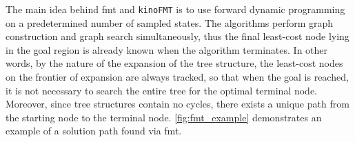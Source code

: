 \begin{algorithm}
\caption{$\texttt{kinoFMT}(x_{init}, X_{goal}, \mathbb{X}, n, J_{th})$}
\label{alg:fmt}
\begin{algorithmic}[1]
    \label{fmt:V}
    \State{$\E \gets \emptyset $}
    \label{fmt:WH}
    \label{fmt:loopz1}
        \label{fmt:z1}
        \label{fmt:loopz2}
        \label{fmt:loopx1}        
            \label{fmt:loopx2}
            \label{fmt:dynprogram}
            \label{fmt:col}
                \label{fmt:col1}
                \label{fmt:col2}
            \EndIf{}
        \EndFor{}
        \label{fmt:empty1}
            \label{fmt:empty2}
        \EndIf{}
        \label{fmt:z2}
    \EndWhile{}
\end{algorithmic}{}
\end{algorithm}

The main idea behind \gls{fmt} and \texttt{kinoFMT} is to use forward dynamic programming on a predetermined number of sampled states. The algorithms perform graph construction and graph search simultaneously, thus the final least-cost node lying in the goal region is already known when the algorithm terminates. In other words, by the nature of the expansion of the tree structure, the least-cost nodes on the frontier of expansion are always tracked, so that when the goal is reached, it is not necessary to search the entire tree for the optimal terminal node. Moreover, since tree structures contain no cycles, there exists a unique path from the starting node to the terminal node. \autoref{fig:fmt_example} demonstrates an example of a solution path found via \gls{fmt}.

